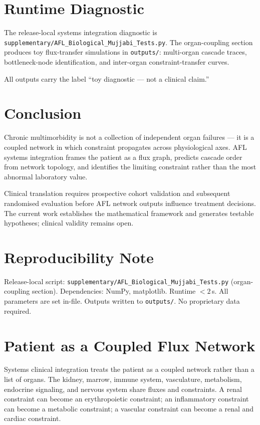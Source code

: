 \documentclass[11pt]{article}
\begin{document}
\section{Runtime Diagnostic}

The release-local systems integration diagnostic is \texttt{supplementary/AFL\_Biological\_Mujjabi\_Tests.py}. The organ-coupling section produces toy flux-transfer simulations in \texttt{outputs/}: multi-organ cascade traces, bottleneck-node identification, and inter-organ constraint-transfer curves.

All outputs carry the label ``toy diagnostic --- not a clinical claim.''

\section{Conclusion}

Chronic multimorbidity is not a collection of independent organ failures --- it is a coupled network in which constraint propagates across physiological axes. AFL systems integration frames the patient as a flux graph, predicts cascade order from network topology, and identifies the limiting constraint rather than the most abnormal laboratory value.

Clinical translation requires prospective cohort validation and subsequent randomised evaluation before AFL network outputs influence treatment decisions. The current work establishes the mathematical framework and generates testable hypotheses; clinical validity remains open.

\section{Reproducibility Note}

Release-local script: \texttt{supplementary/AFL\_Biological\_Mujjabi\_Tests.py} (organ-coupling section). Dependencies: NumPy, matplotlib. Runtime $< 2$\,s. All parameters are set in-file. Outputs written to \texttt{outputs/}. No proprietary data required.



\section{Patient as a Coupled Flux Network}
Systems clinical integration treats the patient as a coupled network rather than a list of organs. The kidney, marrow, immune system, vasculature, metabolism, endocrine signaling, and nervous system share fluxes and constraints. A renal constraint can become an erythropoietic constraint; an inflammatory constraint can become a metabolic constraint; a vascular constraint can become a renal and cardiac constraint.
\end{document}
